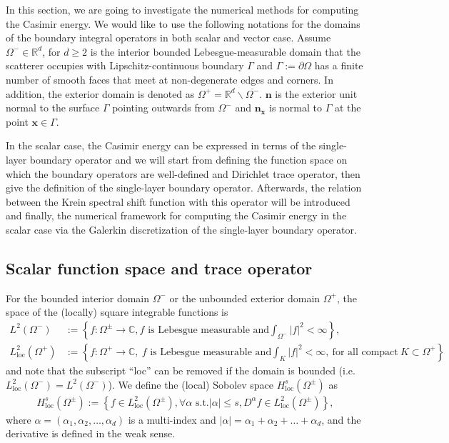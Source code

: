 In this section, we are going to investigate the numerical methods for computing the Casimir energy. 
We would like to use the following notations for the domains of the boundary integral operators in both scalar and vector case. Assume 
$\Omega^{-}\in\mathbb{R}^{d}$, for $d \geq 2$ is the interior bounded Lebesgue-measurable domain that the scatterer occupies with Lipschitz-continuous boundary $\Gamma$ and 
$\Gamma:=\partial\Omega$ has a finite number of smooth faces that meet at non-degenerate edges and corners. In addition, the exterior domain is denoted as 
$\Omega^{+} = \mathbb{R}^{d}\backslash\overline{\Omega^{-}}$. $\boldsymbol{n}$ is the exterior unit normal to the surface $\Gamma$ pointing outwards from $\Omega^{-}$ and 
$\boldsymbol{n}_{\boldsymbol{x}}$ is normal to $\Gamma$ at the point $\boldsymbol{x}\in\Gamma$.

In the scalar case, the Casimir energy can be expressed in terms of the single-layer boundary operator and we will start from defining the function space 
on which the boundary operators are well-defined and Dirichlet trace operator, then give the definition of the single-layer boundary operator. Afterwards, the relation between the Krein 
spectral shift function with this operator will be introduced and finally, the numerical framework for computing the Casimir energy in the scalar case 
via the Galerkin discretization of the single-layer boundary operator.
\subsection{Scalar function space and trace operator}
For the bounded interior domain $\Omega^{-}$ or the unbounded exterior domain $\Omega^{+}$, the space of the (locally) square integrable functions is 
\begin{align*}
    L^{2}(\Omega^{-}) &:= \left\{f:\Omega^{\pm}\rightarrow\mathbb{C}, f \text{ is Lebesgue measurable and} \int_{\Omega^{-}}|f|^{2} < \infty \right\},\\
    L_{\text{loc}}^{2}(\Omega^{+}) &:= \left\{f:\Omega^{+}\rightarrow\mathbb{C},\ f \text{ is Lebesgue measurable and} \int_{K}|f|^{2} < \infty, \ \text{for all compact}\ K \subset \Omega^{+} \right\}
\end{align*}
and note that the subscript ``loc'' can be removed if the domain is bounded (i.e. $L_{\text{loc}}^{2}(\Omega^{-}) = L^{2}(\Omega^{-})$).
We define the (local) Sobolev space $H_{\text{loc}}^{s}(\Omega^{\pm})$ as 
\begin{align*}
    H_{\text{loc}}^{s}(\Omega^{\pm}):=\left\{f\in L_{\text{loc}}^{2}(\Omega^{\pm}), \forall\alpha \text{ s.t.} |\alpha|\leq s, D^{\alpha}f\in L_{\text{loc}}^{2}(\Omega^{\pm})\right\},
\end{align*}
where $\alpha = (\alpha_{1}, \alpha_{2}, \dots, \alpha_{d})$ is a multi-index and $|\alpha| = \alpha_{1} + \alpha_{2} + \dots + \alpha_{d}$, and 
the derivative is defined in the weak sense.

